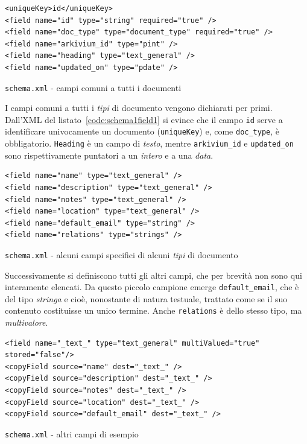 \vspace{1em}
\begin{listing}[H]
\begin{verbatim}
<uniqueKey>id</uniqueKey>
<field name="id" type="string" required="true" />
<field name="doc_type" type="document_type" required="true" />
<field name="arkivium_id" type="pint" />
<field name="heading" type="text_general" />
<field name="updated_on" type="pdate" />
\end{verbatim}
\caption{\texttt{schema.xml} - campi comuni a tutti i documenti}
\label{code:schema1field1}
\end{listing}
\vspace{-1em}
I campi comuni a tutti i \textit{tipi} di documento vengono dichiarati per primi. Dall’XML del listato~\ref{code:schema1field1} si evince che il campo \texttt{id} serve a identificare univocamente un documento (\texttt{uniqueKey}) e, come \texttt{doc\_type}, è obbligatorio. \texttt{Heading} è un campo di \textit{testo}, mentre \texttt{arkivium\_id} e \texttt{updated\_on} sono rispettivamente puntatori a un \textit{intero} e a una \textit{data}.

\vspace{1.8em}
\begin{listing}[H]
\begin{verbatim}
<field name="name" type="text_general" />
<field name="description" type="text_general" />
<field name="notes" type="text_general" />
<field name="location" type="text_general" />
<field name="default_email" type="string" />
<field name="relations" type="strings" />
\end{verbatim}
\caption{\texttt{schema.xml} - alcuni campi specifici di alcuni \textit{tipi} di documento}
\label{code:schema1field2}
\end{listing}
\vspace{-1em}

Successivamente si definiscono tutti gli altri campi, che per brevità non sono qui interamente elencati. Da questo piccolo campione emerge \texttt{default\_email}, che è del tipo \textit{stringa} e cioè, nonostante di natura testuale, trattato come se il suo contenuto costituisse un unico termine. Anche \texttt{relations} è dello stesso tipo, ma \textit{multivalore}.

\vspace{1.8em}
\begin{listing}[H]
\begin{verbatim}
<field name="_text_" type="text_general" multiValued="true" stored="false"/>
<copyField source="name" dest="_text_" />
<copyField source="description" dest="_text_" />
<copyField source="notes" dest="_text_" />
<copyField source="location" dest="_text_" />
<copyField source="default_email" dest="_text_" />
\end{verbatim}
\caption{\texttt{schema.xml} - altri campi di esempio}
\label{code:schema1field3}
\end{listing}
\vspace{-1em}

